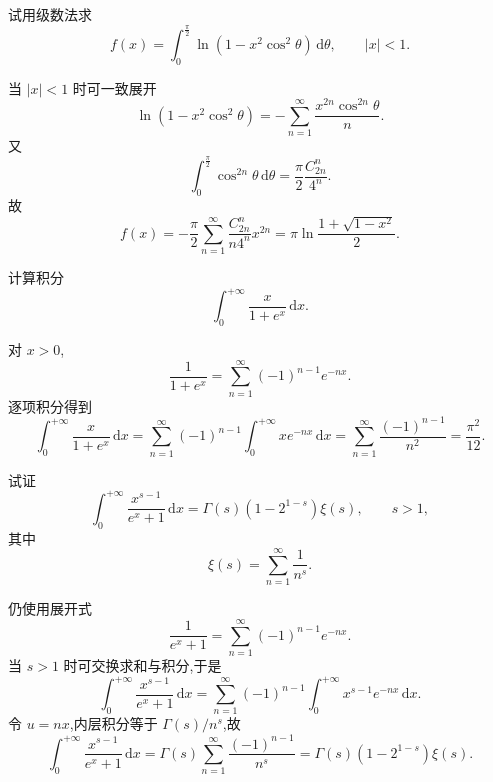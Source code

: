 \begin{example}
    试用级数法求
    \[
        f(x)=\int_0^{\frac{\pi}{2}}\ln(1-x^2\cos^2\theta)\,\mathrm{d}\theta,
        \qquad |x|<1.
    \]
\end{example}
\exampleblank

\begin{solution}
    当 $|x|<1$ 时可一致展开
    \[
        \ln(1-x^2\cos^2\theta)
        =-\sum\limits_{n=1}^{\infty}\dfrac{x^{2n}\cos^{2n}\theta}{n}.
    \]
    又
    \[
        \int_0^{\frac{\pi}{2}}\cos^{2n}\theta\,\mathrm{d}\theta
        =\dfrac{\pi}{2}\dfrac{C_{2n}^n}{4^n}.
    \]
    故
    \[
        f(x)=-\dfrac{\pi}{2}\sum\limits_{n=1}^{\infty}
        \dfrac{C_{2n}^n}{n4^n}x^{2n}
        =\pi\ln\dfrac{1+\sqrt{1-x^2}}{2}.
    \]
\end{solution}

\begin{example}
    计算积分
    \[
        \int_0^{+\infty}\dfrac{x}{1+e^x}\,\mathrm{d}x.
    \]
\end{example}
\exampleblank

\begin{solution}
    对 $x>0$,
    \[
        \dfrac{1}{1+e^x}=\sum\limits_{n=1}^{\infty}(-1)^{n-1}e^{-nx}.
    \]
    逐项积分得到
    \[
        \int_0^{+\infty}\dfrac{x}{1+e^x}\,\mathrm{d}x
        =\sum\limits_{n=1}^{\infty}(-1)^{n-1}\int_0^{+\infty}xe^{-nx}\,\mathrm{d}x
        =\sum\limits_{n=1}^{\infty}\dfrac{(-1)^{n-1}}{n^2}
        =\dfrac{\pi^2}{12}.
    \]
\end{solution}

\begin{example}[\markstar]
    试证
    \[
        \int_0^{+\infty}\dfrac{x^{s-1}}{e^x+1}\,\mathrm{d}x
        =\Gamma(s)(1-2^{1-s})\xi(s),\qquad s>1,
    \]
    其中
    \[
        \xi(s)=\sum\limits_{n=1}^{\infty}\dfrac{1}{n^s}.
    \]
\end{example}
\exampleblank

\begin{solution}
    仍使用展开式
    \[
        \dfrac{1}{e^x+1}=\sum\limits_{n=1}^{\infty}(-1)^{n-1}e^{-nx}.
    \]
    当 $s>1$ 时可交换求和与积分,于是
    \[
        \int_0^{+\infty}\dfrac{x^{s-1}}{e^x+1}\,\mathrm{d}x
        =\sum\limits_{n=1}^{\infty}(-1)^{n-1}
        \int_0^{+\infty}x^{s-1}e^{-nx}\,\mathrm{d}x.
    \]
    令 $u=nx$,内层积分等于 $\Gamma(s)/n^s$,故
    \[
        \int_0^{+\infty}\dfrac{x^{s-1}}{e^x+1}\,\mathrm{d}x
        =\Gamma(s)\sum\limits_{n=1}^{\infty}\dfrac{(-1)^{n-1}}{n^s}
        =\Gamma(s)(1-2^{1-s})\xi(s).
    \]
\end{solution}



